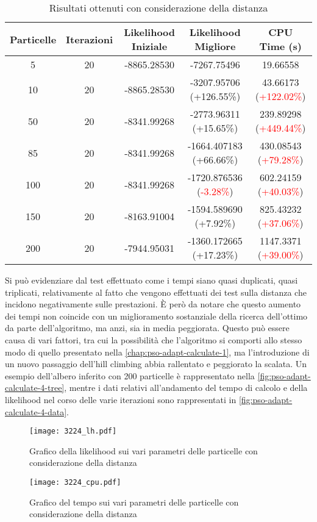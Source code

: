 \begin{table}[!h]
  \centering
  \begin{tabular}{*{5}{c}}
    Particelle & Iterazioni & Likelihood Iniziale & Likelihood Migliore & CPU Time (s) \\ \midrule \midrule
    5 & 20 & -8865.28530 & -7267.75496 & 19.66558 \\
    10 & 20 & -8865.28530 & -3207.95706 (\textcolor{ao(english)}{+126.55\%}) & 43.66173 (\textcolor{red}{+122.02\%}) \\
    50 & 20 & -8341.99268 & -2773.96311 (\textcolor{ao(english)}{+15.65\%}) & 239.89298 (\textcolor{red}{+449.44\%}) \\
    85 & 20 & -8341.99268 & -1664.407183 (\textcolor{ao(english)}{+66.66\%}) & 430.08543 (\textcolor{red}{+79.28\%}) \\
    100 & 20 & -8341.99268 & -1720.876536 (\textcolor{red}{-3.28\%}) & 602.24159 (\textcolor{red}{+40.03\%}) \\
    150 & 20 & -8163.91004 & -1594.589690 (\textcolor{ao(english)}{+7.92\%}) & 825.43232 (\textcolor{red}{+37.06\%}) \\
    200 & 20 & -7944.95031 & -1360.172665 (\textcolor{ao(english)}{+17.23\%}) & 1147.3371 (\textcolor{red}{+39.00\%}) \\
  \end{tabular}
  \caption{Risultati ottenuti con considerazione della distanza}
  \label{tab:pso-adapt-calculate-4-table}
\end{table}

Si può evidenziare dal test effettuato come i tempi siano quasi duplicati, quasi triplicati, relativamente al fatto che vengono effettuati dei test sulla distanza che incidono negativamente sulle prestazioni. È però da notare che questo aumento dei tempi non coincide con un miglioramento sostanziale della ricerca dell'ottimo da parte dell'algoritmo, ma anzi, sia in media peggiorata. Questo può essere causa di vari fattori, tra cui la possibilità che l'algoritmo si comporti allo stesso modo di quello presentato nella \autoref{chap:pso-adapt-calculate-1}, ma l'introduzione di un nuovo passaggio dell'hill climbing abbia rallentato e peggiorato la scalata. Un esempio dell'albero inferito con 200 particelle è rappresentato nella \autoref{fig:pso-adapt-calculate-4-tree}, mentre i dati relativi all'andamento del tempo di calcolo e della likelihood nel corso delle varie iterazioni sono rappresentati in \autoref{fig:pso-adapt-calculate-4-data}.

\begin{figure}[!h]
  \centering
  \begin{minipage}{.45 \textwidth}
  \centering
  \texttt{[image: 3224\_lh.pdf]}
  \caption{Grafico della likelihood sui vari parametri delle particelle con considerazione della distanza}
  \end{minipage}
  \begin{minipage}{.45 \textwidth}
    \centering
    \texttt{[image: 3224\_cpu.pdf]}
    \caption{Grafico del tempo sui vari parametri delle particelle con considerazione della distanza}
  \end{minipage}
  \label{fig:pso-adapt-calculate-1-graph}
\end{figure}

